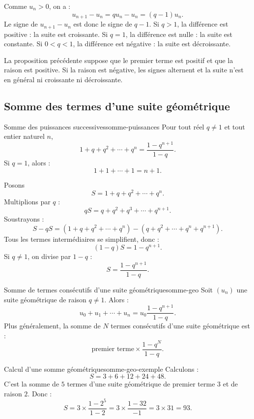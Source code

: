 \documentclass[11pt,a4paper]{article}
\begin{document}
\begin{proofbox}
Comme $u_n>0$, on a :
\[
 u_{n+1}-u_n=qu_n-u_n=(q-1)u_n.
\]
Le signe de $u_{n+1}-u_n$ est donc le signe de $q-1$.
Si $q>1$, la différence est positive : la suite est croissante.
Si $q=1$, la différence est nulle : la suite est constante.
Si $0<q<1$, la différence est négative : la suite est décroissante.
\end{proofbox}

\begin{warningbox}
La proposition précédente suppose que le premier terme est positif et que la raison est positive. Si la raison est négative, les signes alternent et la suite n'est en général ni croissante ni décroissante.
\end{warningbox}

\subsection{Somme des termes d'une suite géométrique}

\begin{theorembox}{Somme des puissances successives}{somme-puissances}
Pour tout réel $q\neq1$ et tout entier naturel $n$,
\[
1+q+q^2+\cdots+q^n=\frac{1-q^{n+1}}{1-q}.
\]
Si $q=1$, alors :
\[
1+1+\cdots+1=n+1.
\]
\end{theorembox}

\begin{proofbox}
Posons
\[
S=1+q+q^2+\cdots+q^n.
\]
Multiplions par $q$ :
\[
qS=q+q^2+q^3+\cdots+q^{n+1}.
\]
Soustrayons :
\[
S-qS=(1+q+q^2+\cdots+q^n)-(q+q^2+\cdots+q^n+q^{n+1}).
\]
Tous les termes intermédiaires se simplifient, donc :
\[
(1-q)S=1-q^{n+1}.
\]
Si $q\neq1$, on divise par $1-q$ :
\[
S=\frac{1-q^{n+1}}{1-q}.
\]
\end{proofbox}

\begin{propositionbox}{Somme de termes consécutifs d'une suite géométrique}{somme-geo}
Soit $(u_n)$ une suite géométrique de raison $q\neq1$.
Alors :
\[
 u_0+u_1+\cdots+u_n=u_0\frac{1-q^{n+1}}{1-q}.
\]
Plus généralement, la somme de $N$ termes consécutifs d'une suite géométrique est :
\[
\text{premier terme}\times\frac{1-q^{N}}{1-q}.
\]
\end{propositionbox}

\begin{examplebox}{Calcul d'une somme géométrique}{somme-geo-exemple}
Calculons :
\[
S=3+6+12+24+48.
\]
C'est la somme de $5$ termes d'une suite géométrique de premier terme $3$ et de raison $2$.
Donc :
\[
S=3\times\frac{1-2^5}{1-2}=3\times\frac{1-32}{-1}=3\times31=93.
\]
\end{examplebox}
\end{document}
